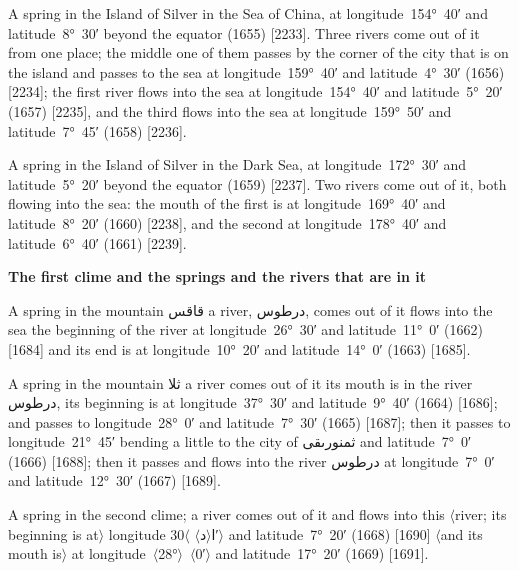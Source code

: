 \documentclass[11pt]{article}
\newcommand{\Pg}[1]{\marginpar{\footnotesize #1}}
\newcommand{\Ang}[1]{\ensuremath{#1}}
\newcommand{\AngOpen}{\ensuremath{\rangle}}
\newcommand{\AngClose}{\ensuremath{\langle}}
\begin{document}
A spring in the Island of Silver in the Sea of China, at longitude~154°~40′ and latitude~8°~30′ beyond the equator (1655) [2233]. Three rivers come out of it from one place; the middle one of them passes by the corner of the city that is on the island and passes to the sea at longitude~159°~40′ and latitude~4°~30′ (1656) [2234]; the first river flows into the sea at longitude~154°~40′ and latitude~5°~20′ (1657) [2235], and the third flows into the sea at longitude~159°~50′ and latitude~7°~45′ (1658) [2236].

A spring in the Island of Silver in the Dark Sea, at longitude~172°~30′ and latitude~5°~20′ beyond the equator (1659) [2237]. Two rivers come out of it, both flowing into the sea: the mouth of the first is at longitude~169°~40′ and latitude~8°~20′ (1660) [2238], and the second at longitude~178°~40′ and latitude~6°~40′ (1661) [2239].

\par\medskip\begin{center}\Pg{p. 110}\bfseries The first clime and the springs and the rivers that are in it\end{center}\par

A spring in the mountain \textarabic{قاقس} a river, \textarabic{درطوس}, comes out of it flows into the sea the beginning of the river at longitude~26°~30′ and latitude~11°~0′ (1662) [1684] and its end is at longitude~10°~20′ and latitude~14°~0′ (1663) [1685].

A spring in the mountain \textarabic{ثلا} a river comes out of it its mouth is in the river \textarabic{درطوس}, its beginning is at longitude~37°~30′ and latitude~9°~40′ (1664) [1686]; and passes to longitude~28°~0′ and latitude~7°~30′ (1665) [1687]; then it passes to longitude~21°~45′ bending a little to the city of \textarabic{ثمنورٮقى} and latitude~7°~0′ (1666) [1688]; then it passes and flows into the river \textarabic{درطوس} at longitude~7°~0′ and latitude~12°~30′ (1667) [1689].

A spring in the second clime; a river comes out of it and flows into this \Ang{\langle}river; its beginning is at\Ang{\rangle} longitude \textarabic{ا\AngOpen{}د\AngClose{}} \Ang{\langle}30′\Ang{\rangle} and latitude~7°~20′ (1668) [1690] \Ang{\langle}and its mouth is\Ang{\rangle} at longitude~\Ang{\langle}28°\Ang{\rangle}~\Ang{\langle}0′\Ang{\rangle} and latitude~17°~20′ (1669) [1691].
\end{document}
